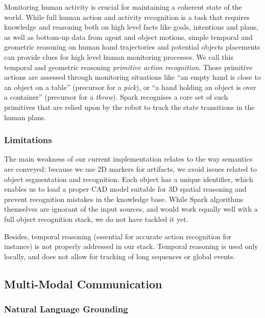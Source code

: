 \documentclass[preprint,3p,times]{elsarticle}
\begin{document}
Monitoring human activity is crucial for maintaining a coherent state of the
world. While full human action and activity recognition is a task that requires
knowledge and reasoning both on high level facts like goals, intentions and
plans, as well as bottom-up data from agent and object motions, simple temporal
and geometric reasoning on human hand trajectories and potential objects
placements can provide clues for high level human monitoring processes. We call
this temporal and geometric reasoning \emph{primitive action recognition}. Those
primitive actions are assessed through monitoring situations like ``an empty
hand is close to an object on a table'' (precursor for a \emph{pick}), or ``a
hand holding an object is over a container'' (precursor for a \emph{throw}).
{\sc Spark} recognises a core set of such primitives that are relied upon by the
robot to track the state transitions in the human plans.

\subsubsection{Limitations}

The main weakness of our current implementation relates to the way semantics are
conveyed: because we use 2D markers for artifacts, we avoid issues related to object
segmentation and recognition. Each object has a unique identifier,
which enables us to load a proper CAD model suitable for 3D spatial reasoning
and prevent recognition mistakes in the knowledge base. While {\sc Spark}
algorithms themselves are ignorant of the input sources, and would work equally
well with a full object recognition stack, we do not have tackled it yet.

Besides, temporal reasoning (essential for accurate action recognition for
instance) is not properly addressed in our stack. Temporal reasoning is used
only locally, and does not allow for tracking of long sequences or global events.


\subsection{Multi-Modal Communication}
\label{sect|com}

\subsubsection{Natural Language Grounding}
\end{document}
